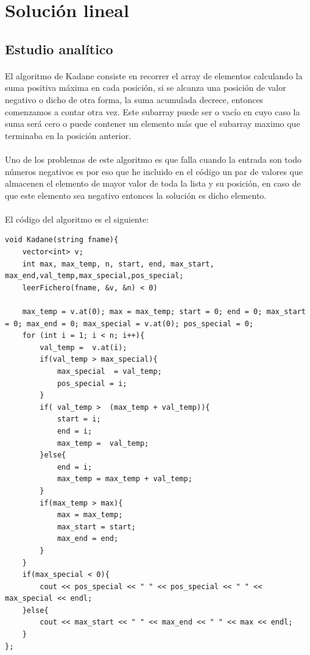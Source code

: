 \documentclass[es]{ifirak}
\begin{document}
\newpage
\section{Solución lineal}
\subsection{Estudio analítico}
\paragraph{}
El algoritmo de Kadane consiste en recorrer el array de elementos calculando la suma positiva máxima en cada posición, si se alcanza una posición de valor negativo o dicho de otra forma, la suma acumulada decrece, entonces comenzamos a contar otra vez. Este subarray puede ser o vacío en cuyo caso la suma será cero o puede contener un elemento más que el subarray maximo que terminaba en la posición anterior.\cite{key-2}

\paragraph{}
Uno de los problemas de este algoritmo es que falla cuando la entrada son todo números negativos es por eso que he incluido en el código un par de valores que almacenen el elemento de mayor valor de toda la lista y su posición, en caso de que este elemento sea negativo entonces la solución es dicho elemento.
\paragraph{}
El código del algoritmo es el siguiente:
\begin{lstlisting}
void Kadane(string fname){
	vector<int> v;
	int max, max_temp, n, start, end, max_start, max_end,val_temp,max_special,pos_special;
	leerFichero(fname, &v, &n) < 0)
	
	max_temp = v.at(0); max = max_temp; start = 0; end = 0; max_start = 0; max_end = 0; max_special = v.at(0); pos_special = 0;
	for (int i = 1; i < n; i++){
		val_temp =  v.at(i);
		if(val_temp > max_special){
			max_special  = val_temp;
			pos_special = i;
		}
		if( val_temp >  (max_temp + val_temp)){
			start = i;
			end = i;
			max_temp =  val_temp;
		}else{
			end = i;
			max_temp = max_temp + val_temp;
		}
		if(max_temp > max){
			max = max_temp;
			max_start = start;
			max_end = end;
		}
	}
	if(max_special < 0){
		cout << pos_special << " " << pos_special << " " << max_special << endl; 
	}else{
		cout << max_start << " " << max_end << " " << max << endl; 
	}
};
\end{lstlisting}
\end{document}
